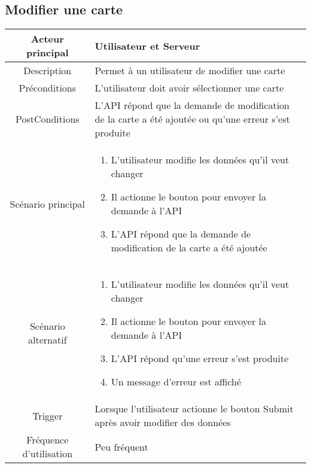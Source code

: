 \documentclass{article}
\begin{document}
\subsection{Modifier une carte}
    \begin{table}[h]
        \begin{tabular}{|c|p{10cm}|}
        \hline
        Acteur principal& Utilisateur et Serveur    \\
        \hline
        Description&  Permet à un utilisateur de modifier une carte  \\
        \hline
        Préconditions&    L'utilisateur doit avoir sélectionner une carte  \\
        \hline
        PostConditions&  L'API répond que la demande de modification de la carte a été ajoutée ou qu'une erreur s'est produite    \\
        \hline
        Scénario principal& 
                \begin{enumerate}
                    \item L'utilisateur modifie les données qu'il veut changer
                    \item Il actionne le bouton pour envoyer la demande à l'API
                    \item L'API répond que la demande de modification de la carte a été ajoutée
                \end{enumerate}     \\
        \hline
        Scénario alternatif&  
        \begin{enumerate}
            \item L'utilisateur modifie les données qu'il veut changer
            \item Il actionne le bouton pour envoyer la demande à l'API
            \item L'API répond qu'une erreur s'est produite
            \item Un message d'erreur est affiché
        \end{enumerate}    \\
        \hline
        Trigger&   Lorsque l'utilisateur actionne le bouton Submit après avoir modifier des données   \\
        \hline
        Fréquence d'utilisation&    Peu fréquent  \\
        \hline
        \end{tabular}
    \end{table}

\newpage
\end{document}
